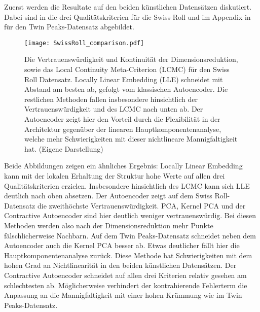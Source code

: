 Zuerst werden die Resultate auf den beiden künstlichen Datensätzen diskutiert. Dabei sind in
 die drei Qualitätskriterien für die Swiss Roll und im Appendix in
 für den Twin Peaks-Datensatz abgebildet.
\begin{figure}[ht]
	\begin{center}
		\texttt{[image: SwissRoll\_comparison.pdf]}
	\end{center}
	\caption[Qualitätskriterien für die Swiss Roll]{Die Vertrauenswürdigkeit und Kontinuität der Dimensionsreduktion, sowie das Local Continuity Meta-Criterion (LCMC) für den Swiss Roll Datensatz. Locally Linear Embedding (LLE) schneidet mit Abstand am besten ab, gefolgt vom klassischen Autoencoder. Die restlichen Methoden fallen insbesondere hinsichtlich der Vertrauenswürdigkeit und des LCMC nach unten ab. Der Autoencoder zeigt hier den Vorteil durch die Flexibilität in der Architektur gegenüber der linearen Hauptkomponentenanalyse, welche mehr Schwierigkeiten mit dieser nichtlineare Mannigfaltigkeit hat. (Eigene Darstellung)}
	\label{fig:SwissRollMetrics}
\end{figure}
Beide Abbildungen zeigen ein ähnliches Ergebnis: Locally Linear Embedding kann mit der lokalen Erhaltung der Struktur hohe Werte auf allen drei Qualitätskriterien erzielen. Insbesondere hinsichtlich des LCMC kann sich LLE deutlich nach oben absetzen.
Der Autoencoder zeigt auf dem Swiss Roll-Datensatz die zweithöchste Vertrauenswürdigkeit. PCA, Kernel PCA und der Contractive Autoencoder sind hier deutlich weniger vertrauenswürdig. Bei diesen Methoden werden also nach der Dimensionsreduktion mehr Punkte fälschlicherweise Nachbarn. Auf dem Twin Peaks-Datensatz schneidet neben dem Autoencoder auch die Kernel PCA besser ab. Etwas deutlicher fällt hier die Hauptkomponentenanalyse zurück. Diese Methode hat Schwierigkeiten mit dem hohen Grad an Nichtlinearität in den beiden künstlichen Datensätzen. Der Contractive Autoencoder schneidet auf allen drei Kriterien relativ gesehen am schlechtesten ab. Möglicherweise verhindert der kontrahierende Fehlerterm die Anpassung an die Mannigfaltigkeit mit einer hohen Krümmung wie im Twin Peaks-Datensatz.

